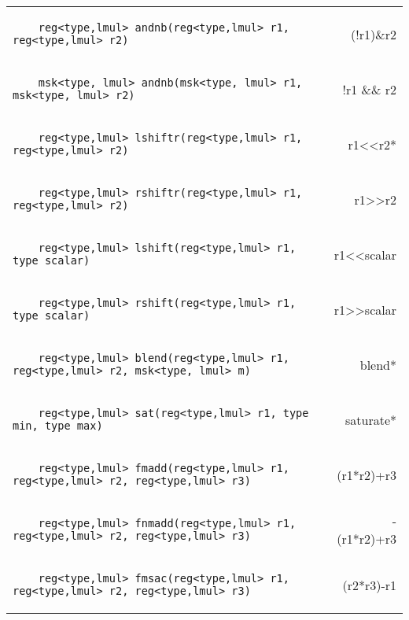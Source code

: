 \begin{center}
\begin{longtable}{l r}
\begin{lstlisting}
    reg<type,lmul> andnb(reg<type,lmul> r1, reg<type,lmul> r2)
\end{lstlisting} & (!r1)\&r2\\
\begin{lstlisting}
    msk<type, lmul> andnb(msk<type, lmul> r1, msk<type, lmul> r2)
\end{lstlisting} & !r1 \&\& r2\\
\begin{lstlisting}
    reg<type,lmul> lshiftr(reg<type,lmul> r1, reg<type,lmul> r2)
\end{lstlisting} & r1<<r2*\\
\begin{lstlisting}
    reg<type,lmul> rshiftr(reg<type,lmul> r1, reg<type,lmul> r2)
\end{lstlisting} & r1>>r2\\
\begin{lstlisting}
    reg<type,lmul> lshift(reg<type,lmul> r1, type scalar)
\end{lstlisting} & r1<<scalar\\
\begin{lstlisting}
    reg<type,lmul> rshift(reg<type,lmul> r1, type scalar)
\end{lstlisting} & r1>>scalar\\
\begin{lstlisting}
    reg<type,lmul> blend(reg<type,lmul> r1, reg<type,lmul> r2, msk<type, lmul> m)
\end{lstlisting} & blend*\\
\begin{lstlisting}
    reg<type,lmul> sat(reg<type,lmul> r1, type min, type max)
\end{lstlisting} & saturate*\\
\begin{lstlisting}
    reg<type,lmul> fmadd(reg<type,lmul> r1, reg<type,lmul> r2, reg<type,lmul> r3)
\end{lstlisting} & (r1*r2)+r3\\
\begin{lstlisting}
    reg<type,lmul> fnmadd(reg<type,lmul> r1, reg<type,lmul> r2, reg<type,lmul> r3)
\end{lstlisting} & -(r1*r2)+r3\\
\begin{lstlisting}
    reg<type,lmul> fmsac(reg<type,lmul> r1, reg<type,lmul> r2, reg<type,lmul> r3)
\end{lstlisting} & (r2*r3)-r1\\

\end{longtable}
\end{center}

